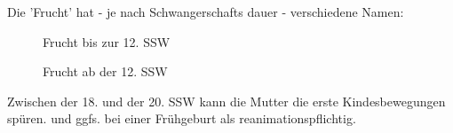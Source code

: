 Die 'Frucht' hat - je nach Schwangerschafts dauer - verschiedene Namen:


\begin{description}
    \item[] Frucht bis zur 12. SSW
    \item[] Frucht ab der 12. SSW
\end{description}

Zwischen der 18. und der 20. SSW kann die Mutter die erste
Kindesbewegungen spüren.  und ggfs. bei einer
Frühgeburt als reanimationspflichtig.





% 
% 
% 
% 
% 
% 
% 
% 
% 
% 
% 
% 



